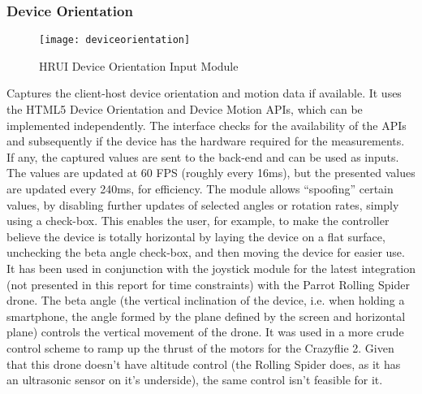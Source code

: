 \subsubsection{Device Orientation} \label{deviceorientation}
\begin{figure}[H]
\centering
\captionsetup{justification=centering}
\texttt{[image: deviceorientation]}
\caption{HRUI Device Orientation Input Module}
\end{figure}
Captures the client-host device orientation and motion data if available. It uses the HTML5 Device Orientation and Device 
Motion APIs, which can be implemented independently. The interface checks for the availability of the APIs and subsequently if 
the device has the hardware required for the measurements. If any, the captured values are sent to the back-end and can be 
used as inputs.  The values are updated at 60 FPS (roughly every 16ms), but the presented values are updated every 240ms, for 
efficiency. The module allows ``spoofing'' certain values, by disabling further updates of selected angles or rotation rates, 
simply using a check-box. This enables the user, for example, to make the controller believe the device is totally horizontal 
by laying the device on a flat surface, unchecking the beta angle check-box, and then moving the device for easier use.\\

It has been used in conjunction with the joystick module for the latest integration (not presented in this report for time 
constraints) with the Parrot Rolling Spider drone. The beta angle (the vertical inclination of the device, i.e. when holding a 
smartphone, the angle formed by the plane defined by the screen and horizontal plane) controls the vertical movement of the 
drone. It was used in a more crude control scheme to ramp up the thrust of the motors for the Crazyflie 2. Given that this 
drone doesn't have altitude control (the Rolling Spider does, as it has an ultrasonic sensor on it's underside), the same 
control isn't feasible for it.
